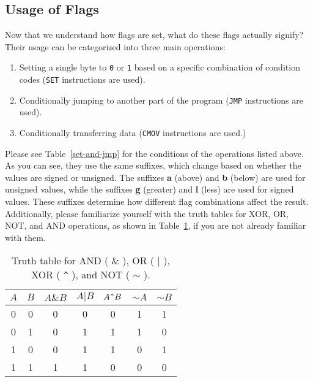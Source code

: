 \subsection{Usage of Flags}
%
Now that we understand how flags are set, what do these flags actually signify? Their usage can be categorized into three main operations:
%
\begin{enumerate}
    \item Setting a single byte to \texttt{0} or \texttt{1} based on a specific 
    combination of condition codes (\texttt{SET} instructions are used).
    \item Conditionally jumping to another part of the program (\texttt{JMP} 
    instructions are used).
    \item Conditionally transferring data (\texttt{CMOV} instructions are used.)
\end{enumerate}
%
Please see Table~\ref{set-and-jmp} for the conditions of the operations 
listed above. As you can see, they use the same suffixes, which change 
based on whether the values are signed or unsigned. The suffixes \textbf{a} 
(above) and \textbf{b} (below) are used for unsigned values, while the suffixes 
\textbf{g} (greater) and \textbf{l} (less) are used for signed values. 
These suffixes determine how different flag combinations affect the result. 
%
Additionally, please familiarize yourself with the truth tables for XOR, 
OR, NOT, and AND operations, as shown in Table~\ref{truth-table}, if you 
are not already familiar with them.
%
\begin{table}[h]
    \centering
    \small
    \renewcommand{\arraystretch}{1.2}
    \begin{tabular}{c c | c c c c c}
        \toprule
        $A$ & $B$ & $A \& B$ & $A | B$ & $A \texttt{\string^} B$ & $\sim A$ & $\sim B$ \\
        \midrule
        0 & 0 & 0 & 0 & 0 & 1 & 1 \\
        0 & 1 & 0 & 1 & 1 & 1 & 0 \\
        1 & 0 & 0 & 1 & 1 & 0 & 1 \\
        1 & 1 & 1 & 1 & 0 & 0 & 0 \\
        \bottomrule
    \end{tabular}
    \caption{Truth table for AND ( $\&$ ), OR ( $|$ ), XOR ( \texttt{\string^} ), and NOT ( $\sim$ ).}
    \label{truth-table}
\end{table}

